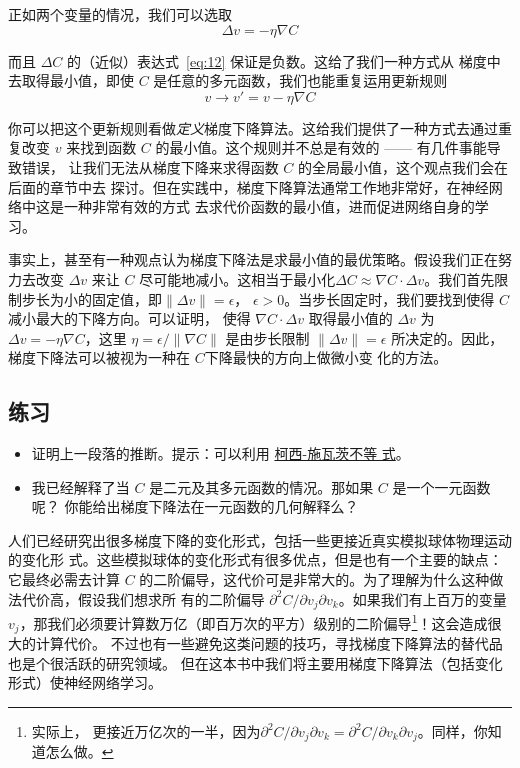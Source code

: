 正如两个变量的情况，我们可以选取
\begin{equation}
  \Delta v = -\eta \nabla C
  \label{eq:14}\tag{14}
\end{equation}

而且 $\Delta C$ 的（近似）表达式~\eqref{eq:12} 保证是负数。这给了我们一种方式从
梯度中去取得最小值，即使 $C$ 是任意的多元函数，我们也能重复运用更新规则
\begin{equation}
  v \rightarrow v' = v-\eta \nabla C
  \label{eq:15}\tag{15}
\end{equation}

你可以把这个更新规则看做\emph{定义}梯度下降算法。这给我们提供了一种方式去通过重
复改变 $v$ 来找到函数 $C$ 的最小值。这个规则并不总是有效的 —— 有几件事能导致错误，
让我们无法从梯度下降来求得函数 $C$ 的全局最小值，这个观点我们会在后面的章节中去
探讨。但在实践中，梯度下降算法通常工作地非常好，在神经网络中这是一种非常有效的方式
去求代价函数的最小值，进而促进网络自身的学习。

事实上，甚至有一种观点认为梯度下降法是求最小值的最优策略。假设我们正在努力去改变
$\Delta v$ 来让 $C$ 尽可能地减小。这相当于最小化$\Delta C \approx \nabla C \cdot
\Delta v$。我们首先限制步长为小的固定值，即$\| \Delta v \| = \epsilon$，
$\epsilon > 0$。当步长固定时，我们要找到使得 $C$ 减小最大的下降方向。可以证明，
使得 $\nabla C \cdot \Delta v$ 取得最小值的 $\Delta v$ 为 $\Delta v = - \eta
\nabla C$，这里 $\eta = \epsilon / \|\nabla C\|$ 是由步长限制 $\|\Delta v\| =
\epsilon$ 所决定的。因此，梯度下降法可以被视为一种在 $C$下降最快的方向上做微小变
化的方法。

\subsection*{练习}

\begin{itemize}
\item 证明上一段落的推断。提示：可以利用
  \href{http://en.wikipedia.org/wiki/Cauchy–Schwarz_inequality}{柯西-施瓦茨不等
    式}。
\item 我已经解释了当 $C$ 是二元及其多元函数的情况。那如果 $C$ 是一个一元函数呢？
  你能给出梯度下降法在一元函数的几何解释么？
\end{itemize}

人们已经研究出很多梯度下降的变化形式，包括一些更接近真实模拟球体物理运动的变化形
式。这些模拟球体的变化形式有很多优点，但是也有一个主要的缺点：它最终必需去计算
$C$ 的二阶偏导，这代价可是非常大的。为了理解为什么这种做法代价高，假设我们想求所
有的二阶偏导 $\partial^2 C/ \partial v_j \partial v_k$。如果我们有上百万的变量
$v_j$，那我们必须要计算数万亿（即百万次的平方）级别的二阶偏导\footnote{实际上，
  更接近万亿次的一半，因为$\partial^2 C/ \partial v_j \partial v_k = \partial^2
  C/ \partial v_k \partial v_j$。同样，你知道怎么做。}！这会造成很大的计算代价。
不过也有一些避免这类问题的技巧，寻找梯度下降算法的替代品也是个很活跃的研究领域。
但在这本书中我们将主要用梯度下降算法（包括变化形式）使神经网络学习。

